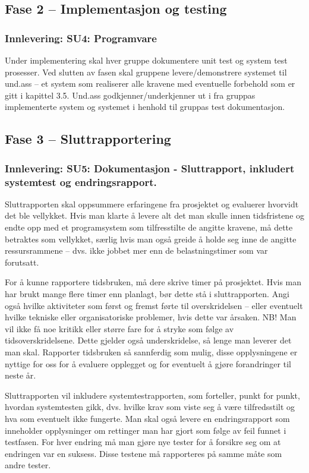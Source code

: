 \subsection{Fase 2 – Implementasjon og testing}

\subsubsection{Innlevering: SU4: Programvare}

Under implementering skal hver gruppe dokumentere unit test og system test prosesser. Ved slutten av fasen skal gruppene levere/demonstrere systemet til und.ass – et system som realiserer alle kravene med eventuelle forbehold som er gitt i kapittel 3.5. Und.ass godkjenner/underkjenner ut i fra gruppas implementerte system og systemet i henhold til gruppas test dokumentasjon.

\subsection{Fase 3 – Sluttrapportering}

\subsubsection{Innlevering: SU5: Dokumentasjon - Sluttrapport, inkludert systemtest og endringsrapport.}

Sluttrapporten skal oppsummere erfaringene fra prosjektet og evaluerer hvorvidt det ble vellykket. Hvis man klarte å levere alt det man skulle innen tidsfristene og endte opp med et programsystem som tilfresstilte de angitte kravene, må dette betraktes som vellykket, særlig hvis man også greide å holde seg inne de angitte ressursrammene – dvs. ikke jobbet mer enn de belastningstimer som var forutsatt. 

For å kunne rapportere tidsbruken, må dere skrive timer på prosjektet. Hvis man har brukt mange flere timer enn planlagt, bør dette stå i sluttrapporten. Angi også hvilke aktiviteter som først og fremst førte til overskridelsen – eller eventuelt hvilke tekniske eller organisatoriske problemer, hvis dette var årsaken. NB! Man vil ikke få noe kritikk eller større fare for å stryke som følge av tidsoverskridelsene. Dette gjelder også underskridelse, så lenge man leverer det man skal. Rapporter tidsbruken så sannferdig som mulig, disse opplysningene er nyttige for oss for å evaluere opplegget og for eventuelt å gjøre forandringer til neste år.

Sluttrapporten vil inkludere systemtestrapporten, som forteller, punkt for punkt, hvordan systemtesten gikk, dvs. hvilke krav som viste seg å være tilfredsstilt og hva som eventuelt ikke fungerte. Man skal også levere en endringsrapport som inneholder opplysninger om rettinger man har gjort som følge av feil funnet i testfasen. For hver endring må man gjøre nye tester for å forsikre seg om at endringen var en suksess. Disse testene må rapporteres på samme måte som andre tester.

